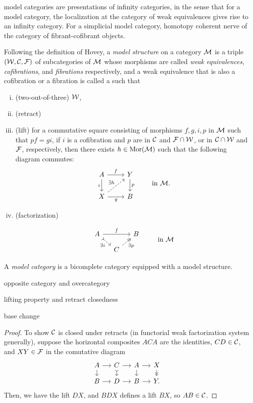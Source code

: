 \documentclass{../../large}
\begin{document}
model categories are presentations of infinity categories, in the sense that for a model category, the localization at the category of weak equivalences gives rise to an infinity category.
For a simplicial model category, homotopy coherent nerve of the category of fibrant-cofibrant objects.


\begin{prb}
Following the definition of Hovey, a \emph{model structure} on a category $\mathcal{M}$ is a triple $(\mathcal{W},\mathcal{C},\mathcal{F})$ of subcategories of $\mathcal{M}$ whose morphisms are called \emph{weak equivalences}, \emph{cofibrations}, and \emph{fibrations} respectively, and a weak equivalence that is also a cofibration or a fibration is called a \emph{} such that
\begin{enumerate}[(i)]
\item (two-out-of-three)
$\mathcal{W}$,
\item (retract)
\item (lift)
for a commutative square consisting of morphisms $f,g,i,p$ in $\mathcal{M}$ such that $pf=gi$, if $i$ is a cofibration and $p$ are in $\mathcal{C}$ and $\mathcal{F}\cap\mathcal{W}$, or in $\mathcal{C}\cap\mathcal{W}$ and $\mathcal{F}$, respectively, then there exists $h\in\operatorname{Mor}(\mathcal{M})$ such that the following diagram commutes:
\[\begin{tikzcd}
A \dar[swap]{i} \rar{f} & Y \dar{p} \\
X \rar[swap]{g} \ar[dashed]{ur}{\exists h} & B
\end{tikzcd}\qquad\text{ in }\cM.\]

\item (factorization)

\[\begin{tikzcd}[sep=small]
A \ar{rr}{f} \ar[>->,dashed,swap]{dr}{\exists i} && B\\
& C \ar[->>,dashed,swap]{ur}{\exists p} &
\end{tikzcd}\qquad\text{ in }\cM\]
\end{enumerate}
A \emph{model category} is a bicomplete category equipped with a model structure.

\begin{parts}
\item opposite category and overcategory
\item lifting property and retract closedness
\item base change
\end{parts}
\end{prb}
\begin{proof}
To show $\mathcal{C}$ is closed under retracts (in functorial weak factorization system generally), suppose the horizontal composites $ACA$ are the identities, $CD\in\mathcal{C}$, and $XY\in\mathcal{F}$ in the comutative diagram
\[\begin{tikzcd}[sep=small]
A\rar\dar&C\rar\dar[>->]&A\rar\dar&X\dar[->>]\\
B\rar&D\rar&B\rar&Y.
\end{tikzcd}\]
Then, we have the lift $DX$, and $BDX$ defines a lift $BX$, so $AB\in\mathcal{C}$.

\end{proof}
\end{document}
